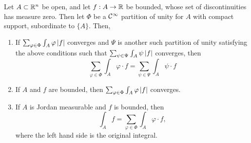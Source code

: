 \begin{simplethm}
    Let $A \subset \mathbb R^n$ be open, and let $f : A \to \mathbb R$ be bounded, whose set of discontinuities has measure zero. Then let $\Phi$ be a $\mathcal C^\infty$ partition of unity for $A$ with compact support, subordinate to $\{A\}$. Then,
    \begin{enumerate}[label=(\roman*)]
        \item If $\sum_{\varphi \in \Phi} \int_A \varphi \left\lvert f \right\rvert$ converges and $\Psi$ is another such partition of unity satisfying the above conditions such that $\sum_{\psi \in \Psi} \int_A \psi \left\lvert f \right\rvert$ converges, then
        \[ \sum_{\varphi \in \Phi} \int_A \varphi \cdot f = \sum_{\psi \in \Psi} \int_A \psi \cdot f \]
        \item If $A$ and $f$ are bounded, then $\sum_{\varphi \in \Phi} \int_A \varphi \left\lvert f \right\rvert$ converges.
        \item If $A$ is Jordan measurable and $f$ is bounded, then
        \[ \int_A f = \sum_{\varphi \in \Phi} \int_A \varphi \cdot f, \]
        where the left hand side is the original integral.
    \end{enumerate}
\end{simplethm}